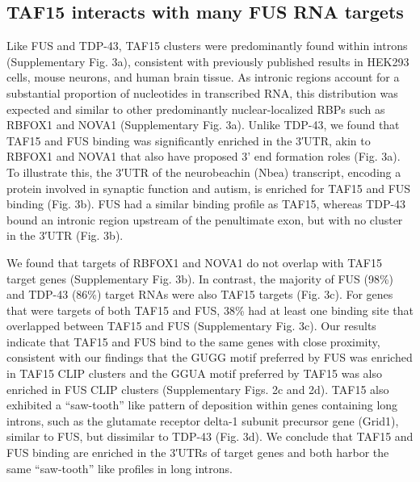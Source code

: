 \subsection{TAF15 interacts with many FUS RNA targets}
Like FUS and TDP-43, TAF15 clusters were predominantly found within introns (Supplementary Fig. 3a), consistent with previously published results in HEK293 cells\cite{Hoell2011}, mouse neurons, and human brain tissue\cite{Ibrahim2013}. As intronic regions account for a substantial proportion of nucleotides in transcribed RNA, this distribution was expected and similar to other predominantly nuclear-localized RBPs such as RBFOX1 and NOVA1 (Supplementary Fig. 3a). Unlike TDP-43, we found that TAF15 and FUS binding was significantly enriched in the 3′UTR, akin to RBFOX1 and NOVA1 that also have proposed 3’ end formation roles\cite{Wang2008,Licatalosi2008} (Fig. 3a). To illustrate this, the 3′UTR of the neurobeachin (Nbea) transcript, encoding a protein involved in synaptic function and autism\cite{Olszewski2012}, is enriched for TAF15 and FUS binding (Fig. 3b). FUS had a similar binding profile as TAF15, whereas TDP-43 bound an intronic region upstream of the penultimate exon, but with no cluster in the 3′UTR (Fig. 3b).


We found that targets of RBFOX1 and NOVA1 do not overlap with TAF15 target genes (Supplementary Fig. 3b). In contrast, the majority of FUS (98\%) and TDP-43 (86\%) target RNAs were also TAF15 targets (Fig. 3c). For genes that were targets of both TAF15 and FUS, 38\% had at least one binding site that overlapped between TAF15 and FUS (Supplementary Fig. 3c). Our results indicate that TAF15 and FUS bind to the same genes with close proximity, consistent with our findings that the GUGG motif preferred by FUS was enriched in TAF15 CLIP clusters and the GGUA motif preferred by TAF15 was also enriched in FUS CLIP clusters (Supplementary Figs. 2c and 2d). TAF15 also exhibited a “saw-tooth” like pattern of deposition within genes containing long introns, such as the glutamate receptor delta-1 subunit precursor gene (Grid1), similar to FUS, but dissimilar to TDP-43\cite{Lagier-Tourenne2012} (Fig. 3d). We conclude that TAF15 and FUS binding are enriched in the 3′UTRs of target genes and both harbor the same “saw-tooth” like profiles in long introns.



